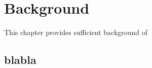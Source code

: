 \chapter{Background} \label{chap:bkg}

This chapter provides sufficient background of 

\section{blabla}
\label{sec:bkg_xx}

